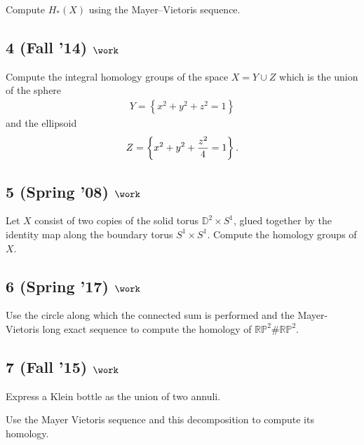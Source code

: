 Compute \(H_* (X)\) using the Mayer--Vietoris sequence.

\hypertarget{fall-14-work-3}{%
\subsection{\texorpdfstring{4 (Fall '14)
\(\work\)}{4 (Fall '14) \textbackslash work}}\label{fall-14-work-3}}

Compute the integral homology groups of the space \(X = Y \cup Z\) which
is the union of the sphere
\begin{align*}
Y = \left\{{x^2 + y^2 + z^2 = 1}\right\}
\end{align*}
and the ellipsoid
\begin{align*}
Z =  \left\{{x^2 + y^2 + {z^2 \over 4} = 1}\right\}
.\end{align*}

\hypertarget{spring-08-work-2}{%
\subsection{\texorpdfstring{5 (Spring '08)
\(\work\)}{5 (Spring '08) \textbackslash work}}\label{spring-08-work-2}}

Let \(X\) consist of two copies of the solid torus
\({\mathbb{D}}^2 \times S^1\), glued together by the identity map along
the boundary torus \(S^1 \times S^1\). Compute the homology groups of
\(X\).

\hypertarget{spring-17-work-1}{%
\subsection{\texorpdfstring{6 (Spring '17)
\(\work\)}{6 (Spring '17) \textbackslash work}}\label{spring-17-work-1}}

Use the circle along which the connected sum is performed and the
Mayer-Vietoris long exact sequence to compute the homology of
\({\mathbb{RP}}^2 \# {\mathbb{RP}}^2\).

\hypertarget{fall-15-work-1}{%
\subsection{\texorpdfstring{7 (Fall '15)
\(\work\)}{7 (Fall '15) \textbackslash work}}\label{fall-15-work-1}}

Express a Klein bottle as the union of two annuli.

Use the Mayer Vietoris sequence and this decomposition to compute its
homology.

